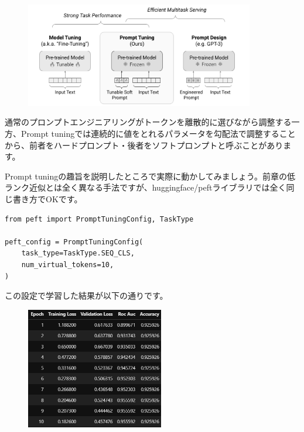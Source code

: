 \documentclass[a5paper,twoside,dvipdfmx]{jsarticle}
\begin{document}
\begin{figure}[h]
  \centering
  \includegraphics[width=100mm]{../C105Fig/gray/prompttuning_image.png}
 \end{figure} 

 

通常のプロンプトエンジニアリングがトークンを離散的に選びながら調整する一方、Prompt tuningでは連続的に値をとれるパラメータを勾配法で調整することから、前者をハードプロンプト・後者をソフトプロンプトと呼ぶことがあります。

Prompt tuningの趣旨を説明したところで実際に動かしてみましょう。前章の低ランク近似とは全く異なる手法ですが、huggingface/peftライブラリでは全く同じ書き方でOKです。

\begin{lstlisting}
from peft import PromptTuningConfig, TaskType

peft_config = PromptTuningConfig(
    task_type=TaskType.SEQ_CLS,
    num_virtual_tokens=10,
)
\end{lstlisting}

この設定で学習した結果が以下の通りです。


\begin{figure}[h]
  \centering
  \includegraphics[width=60mm]{../C105Fig/gray/prompttuning_train.png}
 \end{figure} 
\end{document}
